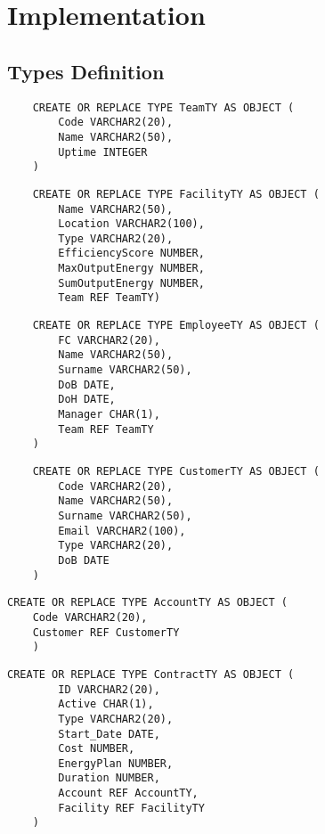 \section{Implementation}
\subsection{Types Definition}

\begin{lstlisting}
    CREATE OR REPLACE TYPE TeamTY AS OBJECT (
        Code VARCHAR2(20),
        Name VARCHAR2(50),
        Uptime INTEGER
    )
\end{lstlisting}

\begin{lstlisting}
    CREATE OR REPLACE TYPE FacilityTY AS OBJECT (
        Name VARCHAR2(50),
        Location VARCHAR2(100),
        Type VARCHAR2(20),
        EfficiencyScore NUMBER,
        MaxOutputEnergy NUMBER,
        SumOutputEnergy NUMBER,
        Team REF TeamTY)
\end{lstlisting}

\begin{lstlisting}
    CREATE OR REPLACE TYPE EmployeeTY AS OBJECT (
        FC VARCHAR2(20),
        Name VARCHAR2(50),
        Surname VARCHAR2(50),
        DoB DATE,
        DoH DATE,
        Manager CHAR(1),
        Team REF TeamTY
    )
\end{lstlisting}


\begin{lstlisting}
    CREATE OR REPLACE TYPE CustomerTY AS OBJECT (
        Code VARCHAR2(20),
        Name VARCHAR2(50),
        Surname VARCHAR2(50),
        Email VARCHAR2(100),
        Type VARCHAR2(20),
        DoB DATE
    )
\end{lstlisting}


\begin{lstlisting}
CREATE OR REPLACE TYPE AccountTY AS OBJECT (
    Code VARCHAR2(20),
    Customer REF CustomerTY
    )
\end{lstlisting}



\begin{lstlisting}
CREATE OR REPLACE TYPE ContractTY AS OBJECT (
        ID VARCHAR2(20),
        Active CHAR(1),
        Type VARCHAR2(20),
        Start_Date DATE,
        Cost NUMBER,
        EnergyPlan NUMBER,
        Duration NUMBER,
        Account REF AccountTY,
        Facility REF FacilityTY
    )
\end{lstlisting}



